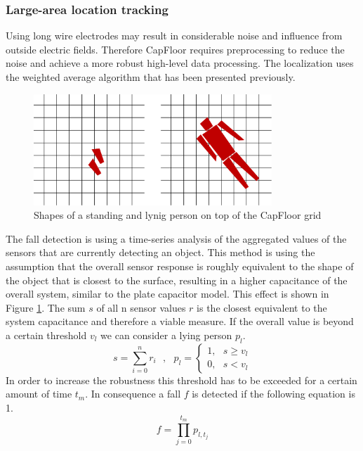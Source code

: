 \subsubsection{Large-area location tracking}
Using long wire electrodes may result in considerable noise and influence from outside electric fields. Therefore CapFloor requires preprocessing to reduce the noise and achieve a more robust high-level data processing. The localization uses the weighted average algorithm that has been presented previously. 
\begin{figure}[h]
\centering
\includegraphics[width=0.8\textwidth]{images/floor_shapes}
\caption{Shapes of a standing and lynig person on top of the CapFloor grid}
\label{fig:capfloor_shapes}
\end{figure}
The fall detection is using a time-series analysis of the aggregated values of the sensors that are currently detecting an object. This method is using the assumption that the overall sensor response is roughly equivalent to the shape of the object that is closest to the surface, resulting in a higher capacitance of the overall system, similar to the plate capacitor model. This effect is shown in Figure \ref{fig:capfloor_shapes}. The sum $s$ of all n sensor values $r$ is the closest equivalent to the system capacitance and therefore a viable measure. If the overall value is beyond a certain threshold $v_l$ we can consider a lying person $p_l$.
\begin{equation}
s=\sum^n_{i=0}{r_i}\ \ \ ,\ \ \ p_l=\left\{ \begin{array}{c}
1,\ \ \ s\ge v_l \\ 
0,\ \ \ s<v_l \end{array}
\right.
\end{equation}
In order to increase the robustness this threshold has to be exceeded for a certain amount of time $t_m$. In consequence a fall $f$ is detected if the following equation is 1.
\begin{equation}
f=\prod^{t_m}_{j=0}{p_{l,t_j}}
\end{equation}
